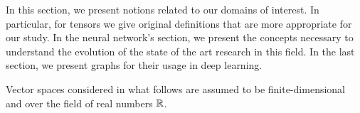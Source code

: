In this section, we present notions related to our domains of interest. In particular, for tensors we give original definitions that are more appropriate for our study. In the neural network's section, we present the concepts necessary to understand the evolution of the state of the art research in this field. In the last section, we present graphs for their usage in deep learning.

Vector spaces considered in what follows are assumed to be finite-dimensional and over the field of real numbers $\mathbb{R}$.